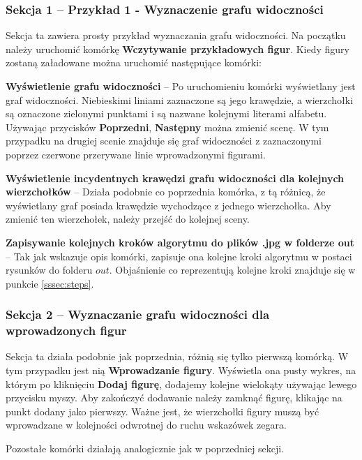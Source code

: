 \documentclass[12pt]{article}
\let\tempone\itemize
\let\temptwo\enditemize
\renewenvironment{itemize}{\tempone\setlength{\itemsep}{0cm}}{\temptwo}
\begin{document}
			\subsubsection{Sekcja 1 -- Przykład 1 - Wyznaczenie grafu widoczności}
				Sekcja ta zawiera prosty przykład wyznaczania grafu widoczności. Na początku należy uruchomić komórkę \textbf{Wczytywanie przykładowych figur}. Kiedy figury zostaną załadowane można uruchomić następujące komórki:
				\begin{itemize}
					\item \textbf{Wyświetlenie grafu widoczności} -- Po uruchomieniu komórki wyświetlany jest graf widoczności. Niebieskimi liniami zaznaczone są jego krawędzie, a wierzchołki są oznaczone zielonymi punktami i są nazwane kolejnymi literami alfabetu. Używając przycisków \textbf{Poprzedni}, \textbf{Następny} można zmienić scenę. W tym przypadku na drugiej scenie znajduje się graf widoczności z zaznaczonymi poprzez czerwone przerywane linie wprowadzonymi figurami.
					\item \textbf{Wyświetlenie incydentnych krawędzi grafu widoczności dla kolejnych wierzchołków} -- Działa podobnie co poprzednia komórka, z tą różnicą, że wyświetlany graf posiada krawędzie wychodzące z jednego wierzchołka. Aby zmienić ten wierzchołek, należy przejść do kolejnej sceny.
					\item \textbf{Zapisywanie kolejnych kroków algorytmu do plików .jpg w folderze out} -- Tak jak wskazuje opis komórki, zapisuje ona kolejne kroki algorytmu w postaci rysunków do folderu $ out $. Objaśnienie co reprezentują kolejne kroki znajduje się w punkcie \ref{sssec:steps}.
				\end{itemize}
	
			\subsubsection{Sekcja 2 -- Wyznaczanie grafu widoczności dla wprowadzonych figur}
				Sekcja ta działa podobnie jak poprzednia, różnią się tylko pierwszą komórką. W tym przypadku jest nią \textbf{Wprowadzanie figury}. Wyświetla ona pusty wykres, na którym po kliknięciu \textbf{Dodaj figurę}, dodajemy kolejne wielokąty używając lewego przycisku myszy. Aby zakończyć dodawanie należy zamknąć figurę, klikając na punkt dodany jako pierwszy. Ważne jest, że wierzchołki figury muszą być wprowadzane w kolejności odwrotnej do ruchu wskazówek zegara.
				
				\vspace{\baselineskip} %
				Pozostałe komórki działają analogicznie jak w poprzedniej sekcji.
			
\end{document}
